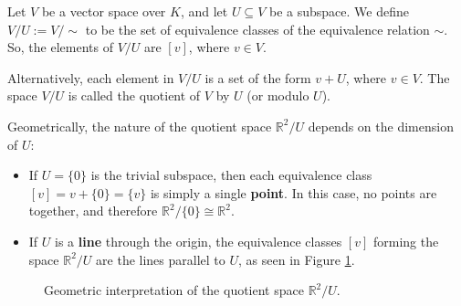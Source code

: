 \begin{definition}
  Let $V$ be a vector space over $K$, and let $U \subseteq V$ be a subspace. We define $V/U := V/\sim$ to be the set of equivalence classes of the equivalence relation $\sim$. So, the elements of $V/U$ are $[v]$, where $v \in V$. 
  
  Alternatively, each element in $V/U$ is a set of the form $v + U$, where $v \in V$. The space $V/U$ is called the quotient of $V$ by $U$ (or modulo $U$).
\end{definition}
\bigbreak
Geometrically, the nature of the quotient space $\mathbb{R}^2/U$ depends on the dimension of $U$:
\begin{itemize}
  \item If $U = \{0\}$ is the trivial subspace, then each equivalence class $[v] = v + \{0\} = \{v\}$ is simply a single \textbf{point}. In this case, no points are  together, and therefore $\mathbb{R}^2/\{0\} \cong \mathbb{R}^2$.
  \item If $U$ is a \textbf{line} through the origin, the equivalence classes $[v]$ forming the space $\mathbb{R}^2/U$ are the lines parallel to $U$, as seen in Figure \cref{fig:quotient_r2}.
\end{itemize}

\begin{figure}[ht!]
  \centering
  \caption{Geometric interpretation of the quotient space $\mathbb{R}^2/U$.}
  \label{fig:quotient_r2}
\end{figure}

